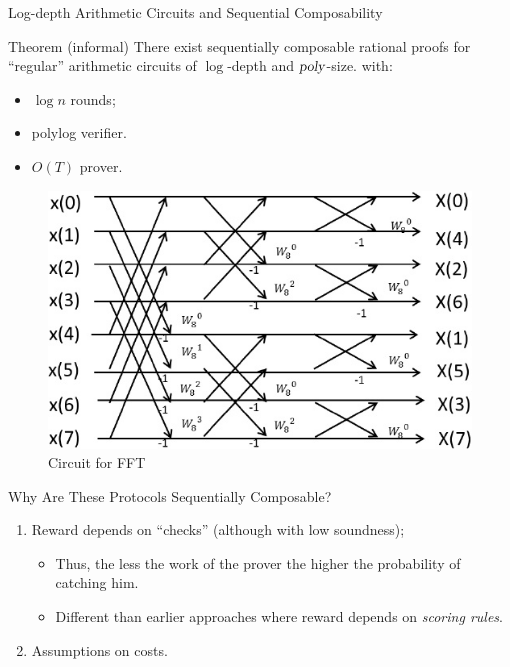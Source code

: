 \begin{frame}[t]{Log-depth Arithmetic Circuits and Sequential Composability}
\begin{block}{Theorem (informal)}
There exist sequentially composable rational proofs for ``regular'' arithmetic circuits of $\log$-depth and ${\textsl{poly}}$-size. with:
		\begin{itemize}
			\item $\log n$ rounds;
			\item polylog verifier.
			\item $O(T)$ prover.
		\end{itemize}
\end{block}

\begin{figure}
	\includegraphics[scale=0.36]{pics/fft.jpg}
	\caption{Circuit for FFT}
\end{figure}
\end{frame}

\begin{frame}{Why Are These Protocols Sequentially Composable?}
	\begin{enumerate}
		\item Reward depends on ``checks'' (although with low soundness);\pause
		\begin{itemize}
			\item Thus, the less the work of the prover the higher the probability of catching him.\pause
			\item Different than earlier approaches where reward depends on \textit{scoring rules}.
		\end{itemize}\pause
		\item Assumptions on costs.
	\end{enumerate}
\end{frame}

